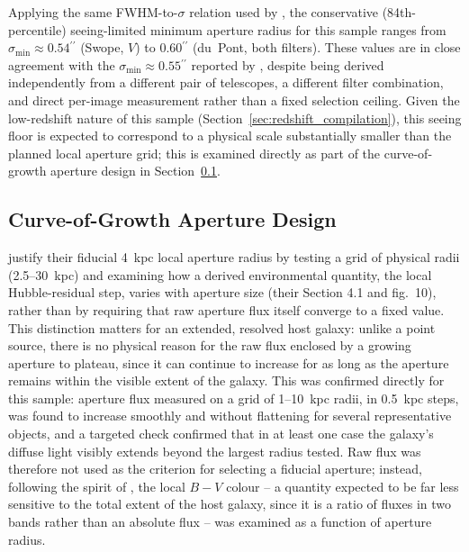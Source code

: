 \documentclass[12pt]{article}
\newcommand{\arcsec}{\ensuremath{^{\prime\prime}}}
\begin{document}
Applying the same FWHM-to-$\sigma$ relation used by \citet{Kelsey2021}, the conservative (84th-percentile) seeing-limited minimum aperture radius for this sample ranges from $\sigma_{\min} \approx 0.54\arcsec$ (Swope, $V$) to $0.60\arcsec$ (du~Pont, both filters). These values are in close agreement with the $\sigma_{\min} \approx 0.55\arcsec$ reported by \citet{Kelsey2021}, despite being derived independently from a different pair of telescopes, a different filter combination, and direct per-image measurement rather than a fixed selection ceiling. Given the low-redshift nature of this sample (Section~\ref{sec:redshift_compilation}), this seeing floor is expected to correspond to a physical scale substantially smaller than the planned local aperture grid; this is examined directly as part of the curve-of-growth aperture design in Section~\ref{sec:aperture_grid}.

\subsection{Curve-of-Growth Aperture Design}
\label{sec:aperture_grid}

\citet{Kelsey2021} justify their fiducial 4~kpc local aperture radius by testing a grid of physical radii (2.5--30~kpc) and examining how a derived environmental quantity, the local Hubble-residual step, varies with aperture size (their Section 4.1 and fig.~10), rather than by requiring that raw aperture flux itself converge to a fixed value. This distinction matters for an extended, resolved host galaxy: unlike a point source, there is no physical reason for the raw flux enclosed by a growing aperture to plateau, since it can continue to increase for as long as the aperture remains within the visible extent of the galaxy. This was confirmed directly for this sample: aperture flux measured on a grid of 1--10~kpc radii, in 0.5~kpc steps, was found to increase smoothly and without flattening for several representative objects, and a targeted check confirmed that in at least one case the galaxy's diffuse light visibly extends beyond the largest radius tested. Raw flux was therefore not used as the criterion for selecting a fiducial aperture; instead, following the spirit of \citet{Kelsey2021}, the local $B-V$ colour -- a quantity expected to be far less sensitive to the total extent of the host galaxy, since it is a ratio of fluxes in two bands rather than an absolute flux -- was examined as a function of aperture radius.
\end{document}
